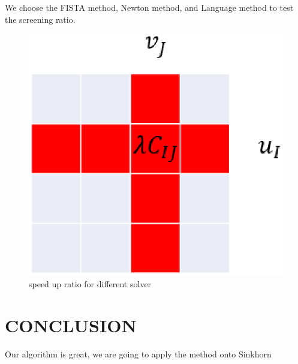 \documentclass[twoside]{article}
\theoremstyle{plain}
\begin{document}
We choose the FISTA method, Newton method, and Language method to test the screening ratio. 
	\begin{figure}[h]
	\begin{center}	
	\includegraphics[width = \linewidth]{pic/divide}
	\caption{speed up ratio for different solver}
	\end{center}	
	\end{figure}



\section{CONCLUSION}
Our algorithm is great, we are going to apply the method onto Sinkhorn


\clearpage





\clearpage
\appendix

\thispagestyle{empty}


\onecolumn \makesupplementtitle
\end{document}
